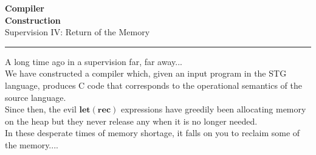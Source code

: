 \documentclass[10pt,a4paper]{exam} %
\begin{document}
\newcommand{\course}{Compiler\\[-0.4cm]Construction}
\newcommand{\week}{IV}

\everymath{\color{campurpledark}}
\everydisplay{\color{campurpledark}}




\marksnotpoints
\pointsdroppedatright
\marksnotpoints
{}

\begin{center}
\LARGE {\textbf{\color{campurpledark} \course} }\\[-0.2cm]
\Large \color{campurpledark} Supervision \week: Return of the Memory\\
\end{center}

{\color{campurple}\hrule}

\newcommand{\metavar}[1]{{\color{campurple}#1}}

\vspace{0.5cm}

\newcommand{\terminal}[1]{\texttt{\color{campurple}#1}}
\newcommand{\bl}[1]{{\color{black}#1}}


\begin{center}
\parbox[c]{340pt}{
A long time ago in a supervision far, far away... \\

We have constructed a compiler which, given an input program in the STG language, produces C code that corresponds to the operational semantics of the source language.\\

Since then, the evil $\mathbf{let}(\mathbf{rec})$ expressions have greedily been allocating memory on the heap but they never release any when it is no longer needed.\\

In these desperate times of memory shortage, it falls on you to reclaim some of the memory....
}
\end{center}
\end{document}
